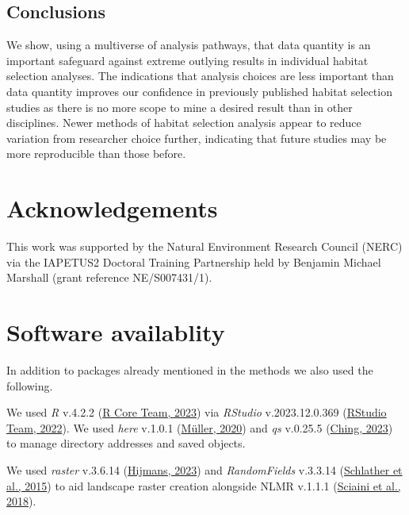 \documentclass[10pt,a4paper]{article}
\begin{document}
\hypertarget{conclusions}{%
\subsection{Conclusions}\label{conclusions}}

We show, using a multiverse of analysis pathways, that data quantity is an important safeguard against extreme outlying results in individual habitat selection analyses.
The indications that analysis choices are less important than data quantity improves our confidence in previously published habitat selection studies as there is no more scope to mine a desired result than in other disciplines.
Newer methods of habitat selection analysis appear to reduce variation from researcher choice further, indicating that future studies may be more reproducible than those before.

\clearpage

\hypertarget{acknowledgements}{%
\section{Acknowledgements}\label{acknowledgements}}

This work was supported by the Natural Environment Research Council (NERC) via the IAPETUS2 Doctoral Training Partnership held by Benjamin Michael Marshall (grant reference NE/S007431/1).

\hypertarget{software-availablity}{%
\section{Software availablity}\label{software-availablity}}

In addition to packages already mentioned in the methods we also used the following.

We used \emph{R} v.4.2.2 (\protect\hyperlink{ref-base}{R Core Team, 2023}) via \emph{RStudio} v.2023.12.0.369 (\protect\hyperlink{ref-rstudio}{RStudio Team, 2022}).
We used \emph{here} v.1.0.1 (\protect\hyperlink{ref-here}{Müller, 2020}) and \emph{qs} v.0.25.5 (\protect\hyperlink{ref-qs}{Ching, 2023}) to manage directory addresses and saved objects.

We used \emph{raster} v.3.6.14 (\protect\hyperlink{ref-raster}{Hijmans, 2023}) and \emph{RandomFields} v.3.3.14 (\protect\hyperlink{ref-RandomFields}{Schlather et al., 2015}) to aid landscape raster creation alongside NLMR v.1.1.1 (\protect\hyperlink{ref-NLMR}{Sciaini et al., 2018}).
\end{document}
